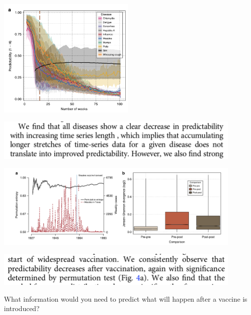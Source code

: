 \documentclass[aspectratio=169]{beamer}
\begin{document}
\begin{frame}

\begin{center}
\includegraphics[width = 0.5\textwidth]{figures/scarpino_on_2019_fig2a}
\end{center}

\begin{center}
\includegraphics[width = 0.9\textwidth]{figures/scarpino_on_2019_more_data_less_predictability}
\end{center}

\end{frame}
\begin{frame}

\begin{center}
\includegraphics[width = 0.9\textwidth]{figures/scarpino_on_2019_fig4}
\end{center}

\begin{center}
\includegraphics[width = 0.9\textwidth]{figures/scarpino_on_2019_predictability_after_vaccination}
\end{center}

\pause
\vfill What information would you need to predict what will happen after a vaccine is introduced?
\end{frame}
\end{document}
